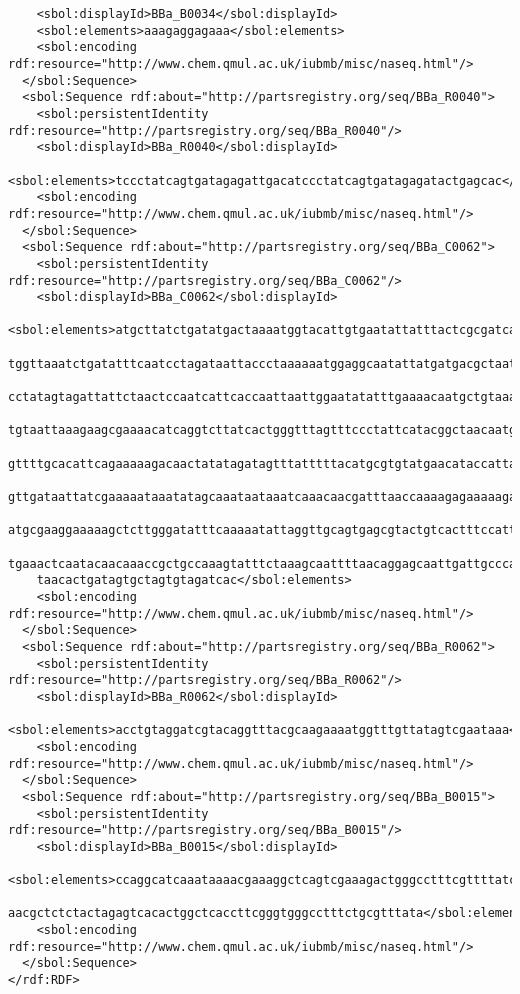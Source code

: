\begin{lstlisting}
    <sbol:displayId>BBa_B0034</sbol:displayId>
    <sbol:elements>aaagaggagaaa</sbol:elements>
    <sbol:encoding rdf:resource="http://www.chem.qmul.ac.uk/iubmb/misc/naseq.html"/>
  </sbol:Sequence>
  <sbol:Sequence rdf:about="http://partsregistry.org/seq/BBa_R0040">
    <sbol:persistentIdentity rdf:resource="http://partsregistry.org/seq/BBa_R0040"/>
    <sbol:displayId>BBa_R0040</sbol:displayId>
    <sbol:elements>tccctatcagtgatagagattgacatccctatcagtgatagagatactgagcac</sbol:elements>
    <sbol:encoding rdf:resource="http://www.chem.qmul.ac.uk/iubmb/misc/naseq.html"/>
  </sbol:Sequence>
  <sbol:Sequence rdf:about="http://partsregistry.org/seq/BBa_C0062">
    <sbol:persistentIdentity rdf:resource="http://partsregistry.org/seq/BBa_C0062"/>
    <sbol:displayId>BBa_C0062</sbol:displayId>
    <sbol:elements>atgcttatctgatatgactaaaatggtacattgtgaatattatttactcgcgatcatttatcctcattcta
    tggttaaatctgatatttcaatcctagataattaccctaaaaaatggaggcaatattatgatgacgctaatttaataaaatatgat
    cctatagtagattattctaactccaatcattcaccaattaattggaatatatttgaaaacaatgctgtaaataaaaaatctccaaa
    tgtaattaaagaagcgaaaacatcaggtcttatcactgggtttagtttccctattcatacggctaacaatggcttcggaatgctta
    gttttgcacattcagaaaaagacaactatatagatagtttatttttacatgcgtgtatgaacataccattaattgttccttctcta
    gttgataattatcgaaaaataaatatagcaaataataaatcaaacaacgatttaaccaaaagagaaaaagaatgtttagcgtgggc
    atgcgaaggaaaaagctcttgggatatttcaaaaatattaggttgcagtgagcgtactgtcactttccatttaaccaatgcgcaaa
    tgaaactcaatacaacaaaccgctgccaaagtatttctaaagcaattttaacaggagcaattgattgcccatactttaaaaattaa
    taacactgatagtgctagtgtagatcac</sbol:elements>
    <sbol:encoding rdf:resource="http://www.chem.qmul.ac.uk/iubmb/misc/naseq.html"/>
  </sbol:Sequence>
  <sbol:Sequence rdf:about="http://partsregistry.org/seq/BBa_R0062">
    <sbol:persistentIdentity rdf:resource="http://partsregistry.org/seq/BBa_R0062"/>
    <sbol:displayId>BBa_R0062</sbol:displayId>
    <sbol:elements>acctgtaggatcgtacaggtttacgcaagaaaatggtttgttatagtcgaataaa</sbol:elements>
    <sbol:encoding rdf:resource="http://www.chem.qmul.ac.uk/iubmb/misc/naseq.html"/>
  </sbol:Sequence>
  <sbol:Sequence rdf:about="http://partsregistry.org/seq/BBa_B0015">
    <sbol:persistentIdentity rdf:resource="http://partsregistry.org/seq/BBa_B0015"/>
    <sbol:displayId>BBa_B0015</sbol:displayId>
    <sbol:elements>ccaggcatcaaataaaacgaaaggctcagtcgaaagactgggcctttcgttttatctgttgtttgtcggtg
    aacgctctctactagagtcacactggctcaccttcgggtgggcctttctgcgtttata</sbol:elements>
    <sbol:encoding rdf:resource="http://www.chem.qmul.ac.uk/iubmb/misc/naseq.html"/>
  </sbol:Sequence>
</rdf:RDF>
\end{lstlisting}

